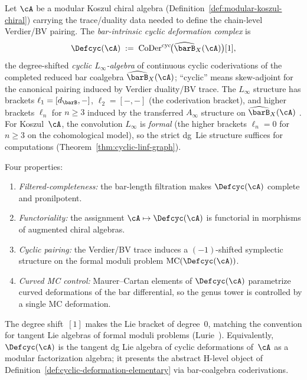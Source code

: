 \begin{definition}
\label{def:cyclic-deformation-bar}
Let $\cA$ be a modular Koszul chiral algebra
(Definition~\ref{def:modular-koszul-chiral}) carrying the trace/duality
data needed to define the chain-level Verdier/BV pairing. The
\emph{bar-intrinsic cyclic deformation complex} is
\begin{equation}\label{eq:def-cyc-bar}
\Defcyc(\cA)
\;:=\;
\operatorname{CoDer}^{\mathrm{cyc}}\!\bigl(
 \widehat{\barB}_X(\cA)
\bigr)[1],
\end{equation}
the degree-shifted \emph{cyclic $L_\infty$-algebra} of continuous
cyclic coderivations of the completed reduced bar coalgebra
$\widehat{\barB}_X(\cA)$; ``cyclic'' means skew-adjoint for the
canonical pairing induced by Verdier duality/BV trace.
The $L_\infty$ structure has brackets $\ell_1 = [d_{\barB},-]$,
$\ell_2 = [-,-]$ (the coderivation bracket), and higher brackets
$\ell_n$ for $n \geq 3$ induced by the transferred $A_\infty$
structure on $\widehat{\barB}_X(\cA)$
\cite[Theorem~10.3.8]{LV12}.
For Koszul~$\cA$, the convolution $L_\infty$ is \emph{formal}
(the higher brackets $\ell_n = 0$ for $n \geq 3$ on the
cohomological model), so the strict dg~Lie structure suffices for
computations
(Theorem~\ref{thm:cyclic-linf-graph}).

Four properties:
\begin{enumerate}[label=\textup{(\roman*)}]
\item \emph{Filtered-completeness:} the bar-length filtration makes
 $\Defcyc(\cA)$ complete and pronilpotent.
\item \emph{Functoriality:} the assignment $\cA \mapsto \Defcyc(\cA)$
 is functorial in morphisms of augmented chiral algebras.
\item \emph{Cyclic pairing:} the Verdier/BV trace induces a
 $(-1)$-shifted symplectic structure on the formal moduli problem
 $\operatorname{MC}(\Defcyc(\cA))$.
\item \emph{Curved MC control:} Maurer--Cartan elements of
 $\Defcyc(\cA)$ parametrize curved deformations of the bar
 differential, so the genus tower is controlled by a single MC
 deformation.
\end{enumerate}
The degree shift~$[1]$ makes the Lie bracket of degree~$0$, matching
the convention for tangent Lie algebras of formal moduli problems
(Lurie~\cite{HA}). Equivalently,
$\Defcyc(\cA)$ is the tangent dg Lie algebra of cyclic deformations
of~$\cA$ as a modular factorization algebra; it presents the abstract
H-level object of Definition~\ref{def:cyclic-deformation-elementary}
via bar-coalgebra coderivations.


\end{definition}
